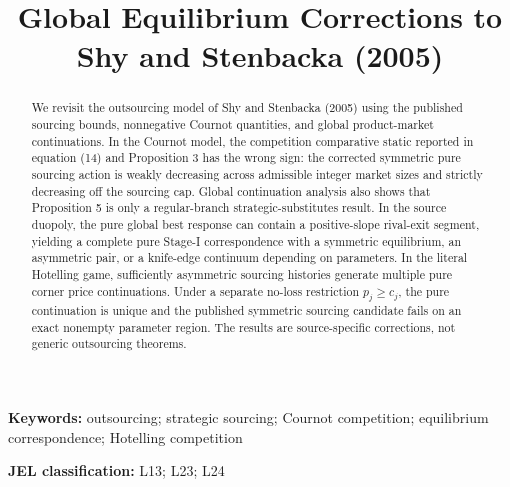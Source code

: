 \documentclass[11pt]{article}
\title{Global Equilibrium Corrections to Shy and Stenbacka (2005)}
\author{}
\date{}
\begin{document}
\maketitle

\begin{abstract}
We revisit the outsourcing model of Shy and Stenbacka (2005) using the published sourcing bounds, nonnegative Cournot quantities, and global product-market continuations.  In the Cournot model, the competition comparative static reported in equation (14) and Proposition 3 has the wrong sign: the corrected symmetric pure sourcing action is weakly decreasing across admissible integer market sizes and strictly decreasing off the sourcing cap.  Global continuation analysis also shows that Proposition 5 is only a regular-branch strategic-substitutes result.  In the source duopoly, the pure global best response can contain a positive-slope rival-exit segment, yielding a complete pure Stage-I correspondence with a symmetric equilibrium, an asymmetric pair, or a knife-edge continuum depending on parameters.  In the literal Hotelling game, sufficiently asymmetric sourcing histories generate multiple pure corner price continuations.  Under a separate no-loss restriction \(p_j\ge c_j\), the pure continuation is unique and the published symmetric sourcing candidate fails on an exact nonempty parameter region.  The results are source-specific corrections, not generic outsourcing theorems.
\end{abstract}

\noindent\textbf{Keywords:} outsourcing; strategic sourcing; Cournot competition; equilibrium correspondence; Hotelling competition

\medskip
\noindent\textbf{JEL classification:} L13; L23; L24














\end{document}
